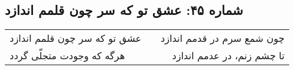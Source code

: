 \begin{center}
\section*{شماره ۴۵: عشق تو که سر چون قلمم اندازد}
\label{sec:045}
\begin{longtable}{l p{0.5cm} r}
عشق تو که سر چون قلمم اندازد
&&
چون شمع سرم در قدمم اندازد
\\
هرگه که وجودت متجلّی گردد
&&
تا چشم زنم، در عدمم اندازد
\\
\end{longtable}
\end{center}
